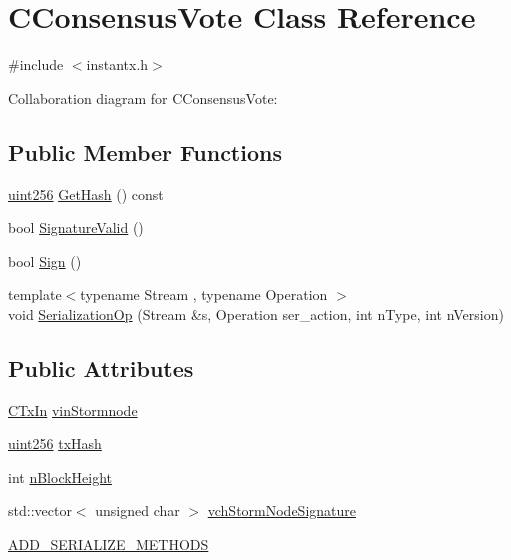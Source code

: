 \hypertarget{class_c_consensus_vote}{}\section{C\+Consensus\+Vote Class Reference}
\label{class_c_consensus_vote}


{\ttfamily \#include $<$instantx.\+h$>$}



Collaboration diagram for C\+Consensus\+Vote\+:
\subsection*{Public Member Functions}
\begin{DoxyCompactItemize}
\item 
\hyperlink{classuint256}{uint256} \hyperlink{class_c_consensus_vote_a694d24883638b550aa2f823fe48ac04b}{Get\+Hash} () const 
\item 
bool \hyperlink{class_c_consensus_vote_ac6550a89acee255e0035e189a42a6310}{Signature\+Valid} ()
\item 
bool \hyperlink{class_c_consensus_vote_a687495887aa75f5d5bb70f93ecb820d0}{Sign} ()
\item 
{\footnotesize template$<$typename Stream , typename Operation $>$ }\\void \hyperlink{class_c_consensus_vote_a103f72505be81d78565e52331b6c563b}{Serialization\+Op} (Stream \&s, Operation ser\+\_\+action, int n\+Type, int n\+Version)
\end{DoxyCompactItemize}
\subsection*{Public Attributes}
\begin{DoxyCompactItemize}
\item 
\hyperlink{class_c_tx_in}{C\+Tx\+In} \hyperlink{class_c_consensus_vote_ab3a273669aecfba15f77c34d33c0ca93}{vin\+Stormnode}
\item 
\hyperlink{classuint256}{uint256} \hyperlink{class_c_consensus_vote_a3eca3f8fac54643f7f2ac863635491d6}{tx\+Hash}
\item 
int \hyperlink{class_c_consensus_vote_a19f39b69e4adf3f9b5557d465cabc7ed}{n\+Block\+Height}
\item 
std\+::vector$<$ unsigned char $>$ \hyperlink{class_c_consensus_vote_aaef3986bf440b3222751f5e7483d7ae1}{vch\+Storm\+Node\+Signature}
\item 
\hyperlink{class_c_consensus_vote_af0f1e45072c8cf14e8e00eb28a505835}{A\+D\+D\+\_\+\+S\+E\+R\+I\+A\+L\+I\+Z\+E\+\_\+\+M\+E\+T\+H\+O\+D\+S}
\end{DoxyCompactItemize}


